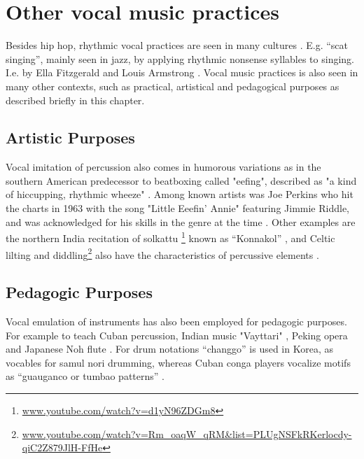 \section{Other vocal music practices}

Besides hip hop, rhythmic vocal practices are seen in many cultures \citep{Sinyor05}. E.g. “scat singing”, mainly seen in jazz, by applying rhythmic nonsense syllables to singing. I.e. by Ella Fitzgerald and Louis Armstrong \citep{Janer_syllablingon}. Vocal music practices is also seen in many other contexts, such as practical, artistical and pedagogical purposes as described briefly in this chapter.
\subsection{ Artistic Purposes}
Vocal imitation of percussion also comes in humorous variations as in the southern American predecessor to beatboxing called "eefing", described as "a kind of hiccupping, rhythmic wheeze" \citep{jennifersharpe2006}. Among known artists was Joe Perkins who hit the charts in 1963 with the song "Little Eeefin' Annie" featuring Jimmie Riddle, and was acknowledged for his skills in the genre at the time  \citep{jennifersharpe2006}. Other examples are the northern India recitation of solkattu \footnote{\url{ www.youtube.com/watch?v=d1yN96ZDGm8}} known as “Konnakol” \citep{proctor2012}, and Celtic lilting and diddling\footnote{\url{www.youtube.com/watch?v=Rm_oaqW_qRM&list=PLUgNSFkRKerlocdy-qiC2Z879JlH-FfHe}} also have the characteristics of percussive elements \citep{proctor2012}.
\subsection{ Pedagogic Purposes}
Vocal emulation of instruments has also been employed for pedagogic purposes. For example to teach Cuban percussion, Indian music "Vayttari" , Peking opera and Japanese Noh flute \citep{Janer_syllablingon}. For drum notations “changgo” is used in Korea, as vocables for samul nori drumming, whereas Cuban conga players vocalize motifs as “guauganco or tumbao patterns” \citep{proctor2012}.
